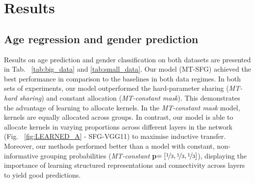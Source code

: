 \section{Results}

\subsection{Age regression and gender prediction}

Results on age prediction and gender classification on both datasets are presented in Tab.~ \ref{tab:big_data} and \ref{tab:small_data}. Our model (MT-SFG) achieved the best performance in comparison to the baselines in both data regimes. In both sets of experiments, our model outperformed the hard-parameter sharing (\emph{MT-hard sharing}) and constant allocation (\emph{MT-constant mask}). This demonstrates the advantage of learning to allocate kernels. In the \emph{MT-constant mask} model, kernels are equally allocated across groups. In contrast, our model is able to allocate kernels in varying proportions across different layers in the network (Fig.~ \ref{fig:LEARNED_A} - SFG-VGG11) to maximise inductive transfer. Moreover, our methods performed better than a model with constant, non-informative grouping probabilities (\emph{MT-constant} \textbf{p}$= [\nicefrac{1}{3}, \nicefrac{1}{3}, \nicefrac{1}{3}]$), displaying the importance of learning structured representations and connectivity across layers to yield good predictions.



